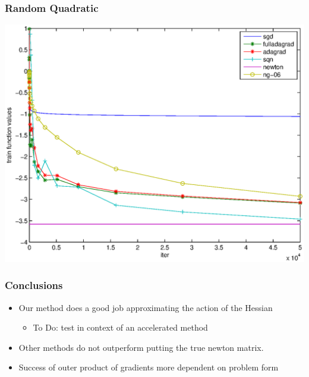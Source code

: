 \documentclass{beamer}
\begin{document}
							 \begin{frame}
							 	\frametitle{Random Quadratic}
								\begin{center}
							 				\includegraphics[scale=0.4]{figures/q.eps}
								\end{center}
							 \end{frame}

\begin{frame}
	\frametitle{Conclusions}
	\begin{itemize}
		\item Our method does a good job approximating the action of the Hessian
		\pause
		\begin{itemize}
			\item To Do: test in context of an accelerated method
		\end{itemize} 
		\pause 
		\item Other methods do not outperform putting the true newton matrix. 
		\pause
		\item Success of outer product of gradients more dependent on problem form
	\end{itemize}
\end{frame}
\end{document}
